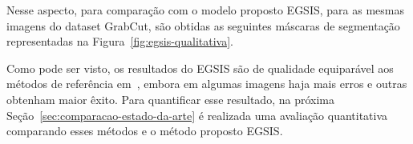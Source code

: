 
Nesse aspecto, para comparação com o modelo proposto \gls{EGSIS}, para
as mesmas imagens do dataset GrabCut, são obtidas as seguintes máscaras
de segmentação representadas na Figura~\ref{fig:egsis-qualitativa}.

\begin{figure}[h!]
        \captionsetup{width=11.5cm}
		\centering
\end{figure}
\FloatBarrier{}



Como pode ser visto, os resultados do \gls{EGSIS} são de qualidade
equiparável aos métodos de referência em~,
embora em algumas imagens haja mais erros e outras obtenham maior
êxito. Para quantificar esse resultado, na próxima
Seção~\ref{sec:comparacao-estado-da-arte} é realizada uma avaliação
quantitativa comparando esses métodos e o método proposto \gls{EGSIS}.



